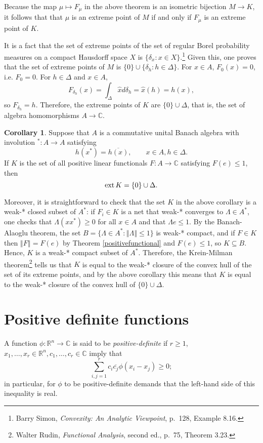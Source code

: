 \documentclass{article}
\newcommand{\ext}{\ensuremath\mathrm{ext}\,}
\newcommand{\norm}[1]{\left\Vert #1 \right\Vert}
\theoremstyle{definition}
\newtheorem{corollary}[theorem]{Corollary}
\theoremstyle{definition}
\begin{document}
Because the map $\mu \mapsto F_\mu$ in the above theorem is an isometric bijection $M \to K$, it follows that that $\mu$ is an extreme point of $M$ if and only if
$F_\mu$ is an extreme point of $K$. 

It is a fact that the set of extreme points of the set of regular Borel probability measures on a compact Hausdorff space $X$
is $\{\delta_x: x \in X\}$.\footnote{Barry Simon, {\em Convexity: An Analytic Viewpoint}, p.~128, Example 8.16.} Given this, one proves that the set of extreme points
of $M$ is $\{0\} \cup \{\delta_h: h\in \Delta\}$. For $x \in A$, $F_0(x)=0$, i.e. $F_0=0$. For $h \in \Delta$ and $x \in A$,
\[
F_{\delta_h}(x) = \int_\Delta \hat{x} d\delta_h = \hat{x}(h) = h(x),
\]
so $F_{\delta_h}=h$. Therefore, the extreme points of $K$ are $\{0\} \cup \Delta$, that is, the set of algebra homomorphisms $A \to \mathbb{C}$.

\begin{corollary}
Suppose that $A$ is a commutative unital Banach algebra with involution $^*:A \to A$ satisfying 
\[
h(x^*)=\overline{h(x)}, \qquad x \in A, h \in \Delta.
\]
If $K$ is the set of all positive linear functionals $F:A \to \mathbb{C}$ satisfying $F(e) \leq 1$, then
\[
\ext K=\{0\} \cup \Delta.
\]
\end{corollary}

Moreover, it is straightforward to check that the set $K$ in the above corollary is a weak-* closed subset of $A^*$: if $F_i \in K$ is a net that weak-* converges
to $\Lambda \in A^*$, one checks that $\Lambda (xx^*) \geq 0$ for all $x \in A$ and that $\Lambda e \leq 1$. By the Banach-Alaoglu theorem, the set
$B=\{\Lambda \in A^*: \norm{\Lambda} \leq 1\}$ is weak-* compact, and if $F \in K$ then $\norm{F} = F(e)$ by Theorem \ref{positivefunctional} and
$F(e) \leq 1$, so $K \subseteq B$. Hence, $K$ is a weak-* compact subset of $A^*$. Therefore, the Krein-Milman
theorem\footnote{Walter Rudin, {\em Functional Analysis}, second ed., p.~75, Theorem 3.23.} tells us that $K$ is equal to the weak-* closure of the convex
hull of the set of its extreme points, and by the above corollary this means that $K$ is equal to the weak-* closure of
the convex hull of $\{0\} \cup \Delta$. 



\section{Positive definite functions}
A function $\phi:\mathbb{R}^n \to \mathbb{C}$ is said to be {\em positive-definite} if $r \geq 1$, $x_1,\ldots,x_r \in \mathbb{R}^n,c_1,\ldots,c_r \in \mathbb{C}$ imply
that
\[
\sum_{i,j=1}^r c_i \overline{c_j} \phi(x_i-x_j) \geq 0;
\]
in particular, for $\phi$ to be positive-definite demands that the left-hand side of this inequality is real.
\end{document}
